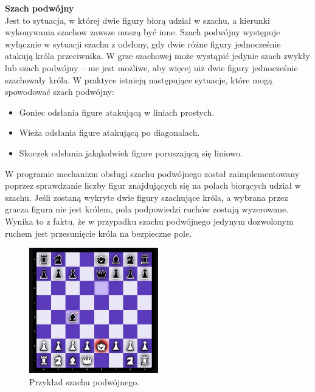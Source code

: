 \documentclass[twoside]{projektInzynierskiMS1}
\begin{document}
\newpage


\noindent \textbf{Szach podwójny}\\
Jest to sytuacja, w której dwie figury biorą udział w szachu, a kierunki wykonywania szachow zawsze muszą być inne. Szach podwójny występuje wyłącznie w sytuacji szachu z odsłony, gdy dwie różne figury jednocześnie atakują króla przeciwnika. W grze szachowej może wystąpić jedynie szach zwykły lub szach podwójny – nie jest możliwe, aby więcej niż dwie figury jednocześnie szachowały króla. W praktyce istnieją następujące sytuacje, które mogą spowodować szach podwójny:

\begin{itemize}
    \item Goniec odsłania figure atakującą w liniach prostych.
    \item Wieża odsłania figure atakującą po diagonalach.
    \item Skoczek odsłania jakąkolwiek figure poruszającą się liniowo.
\end{itemize}

\noindent
W programie mechanizm obsługi szachu podwójnego został zaimplementowany poprzez sprawdzanie liczby figur znajdujących się na polach biorących udział w szachu. Jeśli zostaną wykryte dwie figury szachujące króla, a wybrana przez gracza figura nie jest królem, pola podpowiedzi ruchów zostają wyzerowane. Wynika to z faktu, że w przypadku szachu podwójnego jedynym dozwolonym ruchem jest przesunięcie króla na bezpieczne pole.

\vspace{0.5cm}
\begin{figure}[h!]
    \centering
    \includegraphics[width=0.5\textwidth]{images/imp_double_check.png}
    \caption{Przykład szachu podwójnego.}
\end{figure}

\newpage
\end{document}
